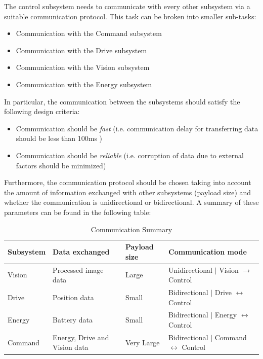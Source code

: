 \documentclass[10pt,twoside]{article}
\begin{document}
The control subsystem needs to communicate with every other subsystem via a suitable communication protocol. 
This task can be broken into smaller sub-tasks:
\begin{itemize}
    \itemsep-0.2em
    \item Communication with the Command subsystem
    \item Communication with the Drive subsystem
    \item Communication with the Vision subsystem
    \item Communication with the Energy subsystem
\end{itemize}
In particular, the communication between the subsystems should satisfy the following design criteria:
\begin{itemize}
    \item Communication should be \emph{fast} (i.e. communication delay for transferring data should be less than 100ms )
    \item Communication should be \emph{reliable} (i.e. corruption of data due to external factors should be minimized)
\end{itemize}

Furthermore, the communication protocol should be chosen taking into account the amount of information exchanged with other subsystems (payload size) and whether the communication is unidirectional or bidirectional. A summary of these parameters can be found in the following table:


\begin{table}[hbt]
\centering
\renewcommand{\arraystretch}{1.3}
\begin{tabular}{@{}llll@{}}
\toprule
Subsystem & Data   exchanged                & Payload size & Communication   mode                                       \\ \midrule
Vision    & Processed   image data          & Large        & Unidirectional  $\vert$ Vision $\rightarrow$ Control            \\
Drive     & Position data                   & Small        & Bidirectional  $\vert$ Drive $\leftrightarrow$ Control   \\
Energy    & Battery data                    & Small        & Bidirectional  $\vert$ Energy $\leftrightarrow$ Control  \\
Command   & Energy, Drive   and Vision data & Very Large   & Bidirectional  $\vert$ Command $\leftrightarrow$ Control \\ \bottomrule
\end{tabular}
\caption{Communication Summary}
\end{table}
\end{document}
